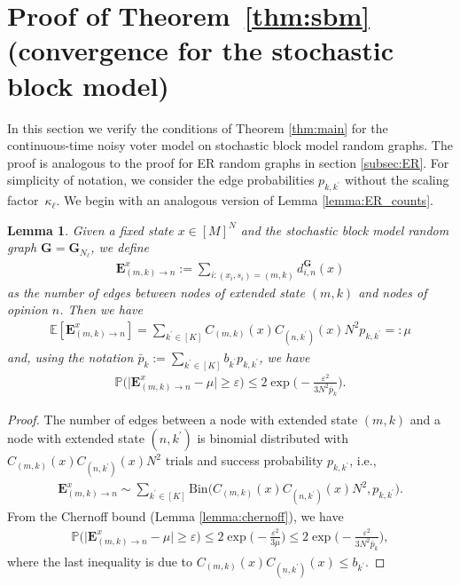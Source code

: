 \documentclass[a4paper,
               10pt,
               pdftex,
               normalheadings,
               headsepline,
               footsepline,
               headinclude,
               footinclude,
               DIV=14,
               abstracton]
{scrartcl}
\newtheorem{lemma}[theorem]{Lemma}
\newcommand{\rv}[1]{\bm{#1}}
\begin{document}
\section{Proof of Theorem~\ref{thm:sbm} (convergence for the stochastic block model)} \label{sec:appendix_proof_sbm}
In this section we verify the conditions of Theorem \ref{thm:main} for the continuous-time noisy voter model on stochastic block model random graphs.
The proof is analogous to the proof for ER random graphs in section \ref{subsec:ER}.
For simplicity of notation, we consider the edge probabilities $p_{k,{k^\prime}}$ without the scaling factor~$\kappa_\ell$.
We begin with an analogous version of Lemma \ref{lemma:ER_counts}.
\begin{lemma} \label{lemma:sbm_counts}
Given a fixed state $x \in [M]^N$ and the stochastic block model random graph $\rv{G} = \rv{G}_{N_\ell}$, we define
\begin{align}
    \rv{E}^x_{(m,k)\to n} := \sum_{i: (x_i, s_i) = (m, k)} d_{i, n}^{\rv{G}}(x)
\end{align}
    as the number of edges between nodes of extended state $(m, k)$ and nodes of opinion $n$.
    Then we have
\begin{align}
    \mathbb{E}[\rv{E}^x_{(m,k)\to n}] = \sum_{{k^\prime} \in [K]} C_{(m,k)}(x) C_{(n,{k^\prime})}(x) N^2 p_{k,{k^\prime}} =: \mu
\end{align}
and, using the notation $\bar{p}_k := \sum_{{k^\prime} \in [K]} b_{k^\prime} p_{k,{k^\prime}}$, we have
\begin{align}
    \mathbb{P}\Big( \Big\lvert \rv{E}^x_{(m,k)\to n} - \mu \Big\rvert \geq \varepsilon\Big) \leq 2 \exp\Big(-\frac{ \varepsilon^2}{3 N^2 \bar{p}_k }\Big).
\end{align}
\end{lemma}
\begin{proof}
    The number of edges between a node with extended state $(m,k)$ and a node with extended state $(n,{k^\prime})$ is binomial distributed with $C_{(m,k)}(x) C_{(n,{k^\prime})}(x) N^2$ trials and success probability $p_{k,{k^\prime}}$, i.e.,
    \begin{align}
        \rv{E}^x_{(m,k)\to n} \sim \sum_{{k^\prime} \in [K]} \text{Bin}\big(C_{(m,k)}(x) C_{(n,{k^\prime})}(x) N^2, p_{k,{k^\prime}}\big).
    \end{align}
    From the Chernoff bound (Lemma \ref{lemma:chernoff}), we have
    \begin{align}
    \mathbb{P}\Big( \Big\lvert \rv{E}^x_{(m,k)\to n} - \mu \Big\rvert\geq \varepsilon\Big) \leq 2 \exp\Big(-\frac{\varepsilon^2}{3 \mu}\Big) \leq 2 \exp\Big(-\frac{ \varepsilon^2}{3 N^2 \bar{p}_k }\Big),
    \end{align}
    where the last inequality is due to $C_{(m,k)}(x) C_{(n,{k^\prime})}(x) \leq b_{k^\prime}$.
\end{proof}
\end{document}
